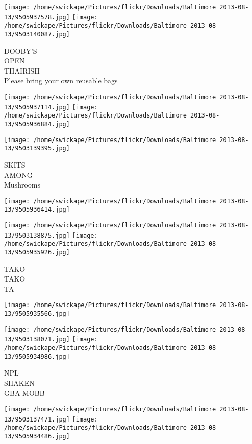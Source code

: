 \documentclass[10pt,letterpaper]{article}
\begin{document}
\texttt{[image: /home/swickape/Pictures/flickr/Downloads/Baltimore 2013-08-13/9505937578.jpg]}
\texttt{[image: /home/swickape/Pictures/flickr/Downloads/Baltimore 2013-08-13/9503140087.jpg]}

DOOBY'S\\
OPEN\\
THAIRISH\\
Please bring your own reusable bags\\
\pagebreak

\texttt{[image: /home/swickape/Pictures/flickr/Downloads/Baltimore 2013-08-13/9505937114.jpg]}
\texttt{[image: /home/swickape/Pictures/flickr/Downloads/Baltimore 2013-08-13/9505936884.jpg]}

\texttt{[image: /home/swickape/Pictures/flickr/Downloads/Baltimore 2013-08-13/9503139395.jpg]}

SKITS\\
AMONG\\
Mushrooms\\
\pagebreak

\texttt{[image: /home/swickape/Pictures/flickr/Downloads/Baltimore 2013-08-13/9505936414.jpg]}

\vspace{0.25in}
\texttt{[image: /home/swickape/Pictures/flickr/Downloads/Baltimore 2013-08-13/9503138875.jpg]}
\texttt{[image: /home/swickape/Pictures/flickr/Downloads/Baltimore 2013-08-13/9505935926.jpg]}

TAKO\\
TAKO\\
TA\\
\pagebreak

\texttt{[image: /home/swickape/Pictures/flickr/Downloads/Baltimore 2013-08-13/9505935566.jpg]}

\vspace{0.25in}
\texttt{[image: /home/swickape/Pictures/flickr/Downloads/Baltimore 2013-08-13/9503138071.jpg]}
\texttt{[image: /home/swickape/Pictures/flickr/Downloads/Baltimore 2013-08-13/9505934986.jpg]}

NPL\\
SHAKEN\\
GBA MOBB\\
\pagebreak

\texttt{[image: /home/swickape/Pictures/flickr/Downloads/Baltimore 2013-08-13/9503137471.jpg]}
\texttt{[image: /home/swickape/Pictures/flickr/Downloads/Baltimore 2013-08-13/9505934486.jpg]}
\end{document}
